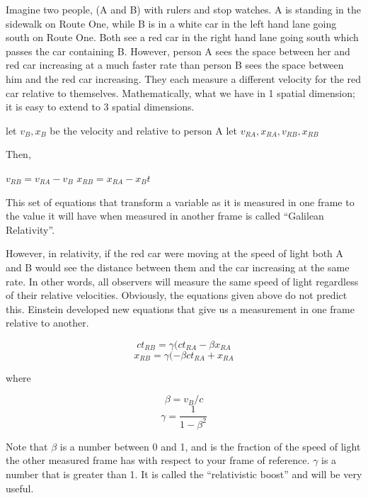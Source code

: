 Imagine two people, (A and B) with rulers and stop watches.  A is standing in the sidewalk on Route One, while B is in a white car in the left hand lane going south on Route One.  Both see a red car in the right hand lane going south which passes the car containing B.  However, person A sees the space between her and red car increasing at a much faster rate than person B sees the space between him and the red car increasing.  They each measure a different velocity for the red car relative to themselves.  Mathematically, what we have in 1 spatial dimension; it is easy to extend to 3 spatial dimensions.

	 let $v_B, x_B$ be the velocity and relative to person A 
       let $v_{RA}, x_{RA},v_{RB}, x_{RB}$
	  

Then,
	  
	  $v_{RB} = v_{RA} - v_B$
        $x_{RB} = x_{RA} - x_B t$

This set of equations that transform a variable as it is measured in one frame to the value it will have when measured in another frame is called “Galilean Relativity”.

However, in relativity, if the red car were moving at the speed of light both A and B would see the distance between them and the car increasing at the same rate.  In other words, all observers will measure the same speed of light regardless of their relative velocities.  Obviously, the equations given above do not predict this.  Einstein developed new equations that give us a measurement in one frame relative to another.  


	\begin{equation} ct_{RB} = \gamma(ct_{RA} - \beta x_{RA} \end{equation} 
	\begin{equation}  x_{RB} = \gamma(- \beta ct_{RA} + x_{RA} 	 \end{equation} 

where

	\begin{equation} \beta = v_B /c \end{equation}   	
	 \begin{equation} \gamma = \frac{1}{1- \beta^2} \end{equation}  


Note that $\beta$  is a number between 0 and 1, and is the fraction of the speed of light the other measured frame has with respect to your frame of reference.  $\gamma$  is a number that is greater than 1.  It is called the “relativistic boost” and will be very useful.

